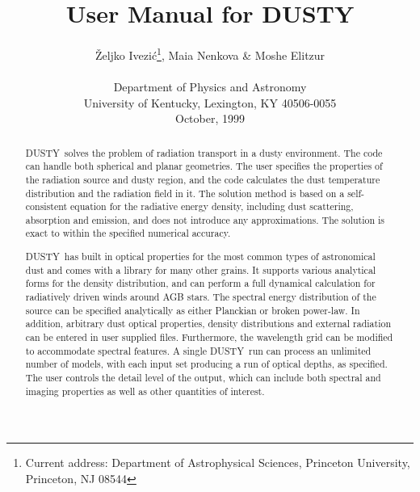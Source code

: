 \documentclass[12pt]{article} \usepackage{epsf}
\def\D  {{\sf DUSTY}}
\def\Ivezic {Ivezi\'c}
\def\tthdump#1{#1}      %
\begin{document}
\title                  {\sc User Manual for DUSTY}

\author{ \v Zeljko \Ivezic\footnote{Current address:
                Department of Astrophysical Sciences,
                Princeton University, Princeton, NJ 08544},
        Maia Nenkova \& Moshe Elitzur
        \\ \\ Department of Physics and Astronomy
        \\    University of Kentucky, Lexington, KY 40506-0055
        \\[0.5in] October, 1999}
\date{}
\maketitle

\vfil
\begin{abstract}

\D\ solves the problem of radiation transport in a dusty environment.  The code
can handle both spherical and planar geometries.   The user specifies the
properties of the radiation source and dusty region, and the code calculates
the dust temperature distribution and the radiation field in it. The solution
method is based on a self-consistent equation for the radiative energy density,
including dust scattering, absorption and emission, and does not introduce any
approximations. The solution is exact to within the specified numerical
accuracy.

\D\ has built in optical properties for the most common types of astronomical
dust and comes with a library for many other grains. It supports various
analytical forms for the density distribution, and can perform a full dynamical
calculation for radiatively driven winds around AGB stars. The spectral energy
distribution of the source can be specified analytically as either Planckian or
broken power-law. In addition, arbitrary dust optical properties, density
distributions and external radiation can be entered in user supplied files.
Furthermore, the wavelength grid can be modified to accommodate spectral
features.  A single \D\ run can process an unlimited number of models, with
each input set producing a run of optical depths, as specified. The user
controls the detail level of the output, which can include both spectral and
imaging properties as well as other quantities of interest.

\end{abstract}

\newpage
\tthdump{\vglue 1in}
\end{document}
